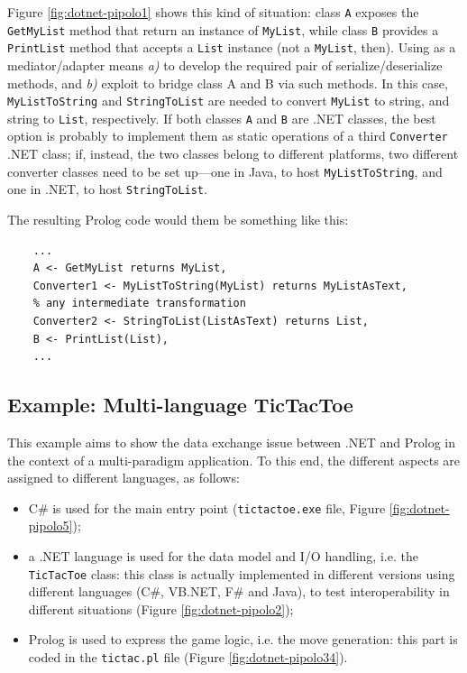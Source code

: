 Figure \ref{fig:dotnet-pipolo1} shows this kind of situation: class \texttt{A} exposes the \texttt{GetMyList} method that return an instance of \texttt{MyList}, while class \texttt{B} provides a \texttt{PrintList} method that accepts a \texttt{List} instance (not a \texttt{MyList}, then).
Using \tuprolog{} as a mediator/adapter means \textit{a)} to develop the required pair of serialize/deserialize methods, and \textit{b)} exploit \tuprolog{} to bridge class A and B via such methods.
In this case, \texttt{MyListToString} and \texttt{StringToList} are needed to convert \texttt{MyList} to string, and string to \texttt{List}, respectively.
%
If both classes \texttt{A} and \texttt{B} are .NET classes, the best option is probably to implement them as static operations of a third \texttt{Converter} .NET class; if, instead, the two classes belong to different platforms, two different converter classes need to be set up---one in Java, to host \texttt{MyListToString}, and one in .NET, to host \texttt{StringToList}.

The resulting Prolog code would them be something like this:
\begin{verbatim}
    ...
    A <- GetMyList returns MyList,
    Converter1 <- MyListToString(MyList) returns MyListAsText,
    % any intermediate transformation
    Converter2 <- StringToList(ListAsText) returns List,
    B <- PrintList(List),
    ...
\end{verbatim}


\subsection{Example: Multi-language TicTacToe}
\label{ssec:mpp-tictactoe}

This example aims to show the data exchange issue between .NET and Prolog in the context of a multi-paradigm application. To this end, the different aspects are assigned to different languages, as follows:
\begin{itemize}
  \item C\# is used for the main entry point (\texttt{tictactoe.exe} file, Figure \ref{fig:dotnet-pipolo5});
  \item a .NET language is used for the data model and I/O handling, i.e. the \texttt{TicTacToe} class: this class is actually implemented in different versions using different languages (C\#, VB.NET, F\# and Java), to test interoperability in different situations (Figure \ref{fig:dotnet-pipolo2});
  \item Prolog is used to express the game logic, i.e. the move generation: this part is coded in the \texttt{tictac.pl} file (Figure \ref{fig:dotnet-pipolo34}).
\end{itemize}

